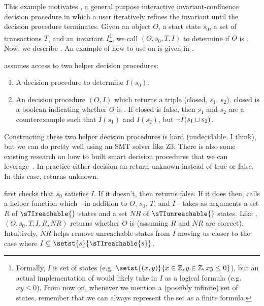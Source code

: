 

This example motivates , a general
purpose interactive invariant-confluence decision procedure in which a user
iteratively refines the invariant until the decision procedure terminates.
Given an object $O$, a start state $s_0$, a set of transactions $T$, and an
invariant $I$\footnote{%
  Formally, $I$ is set of states (e.g. $\setst{(x, y)}{x \in \ints, y \in
  \ints, xy \leq 0}$), but an actual implementation of \IsInvConfluent{} would
  likely take in $I$ as a logical formula (e.g. $xy \leq 0$). From now on,
  whenever we mention a (possibly infinite) set of states, remember that we can
  always represent the set as a finite formula.
}, we call \IsInvConfluent$(O, s_0, T, I)$ to determine if $O$ is
\sTIconfluent{}. Now, we describe . An
example of how to use  on
 is given in
.

\IsInvConfluent{} assumes access to two helper decision procedures:
\begin{enumerate}
  \item
    A decision procedure to determine $I(s_0)$.

  \item
    An \Iclosed{} decision procedure \IsIclosed$(O, I)$ which returns a triple
    (closed, $s_1$, $s_2$). closed is a boolean indicating whether $O$ is
    \Iclosed{}. If closed is false, then $s_1$ and $s_2$ are a counterexample
    such that $I(s_1)$ and $I(s_2)$, but $\lnot I(s_1 \sqcup s_2)$.
\end{enumerate}

Constructing these two helper decision procedures is hard (undecidable, I
think), but we can do pretty well using an SMT solver like Z3. There is also
some existing research on how to built smart \Iclosed{} decision procedures
that we can leverage~\cite{li2014automating}. In practice either decision an
return unknown instead of true or false. In this case, \IsInvConfluent{} returns
unknown.

\IsInvConfluent{} first checks that $s_0$ satisfies $I$. If it doesn't, then
\IsInvConfluent{} returns false. If it does then, \IsInvConfluent{} calls a
helper function \Helper{} which---in addition to $O$, $s_0$, $T$, and
$I$---takes as arguments a set $R$ of $\sTIreachable{}$ states and a set $NR$
of $\sTIunreachable{}$ states. Like \IsInvConfluent, \Helper$(O, s_0, T, I, R,
NR)$ returns whether $O$ is \sTIconfluent{} (assuming $R$ and $NR$ are
correct). Intuitively, $NR$ helps remove unreachable states from $I$ moving us
closer to the case where $I \subseteq \setst{s}{\sTIreachable{s}}$.


